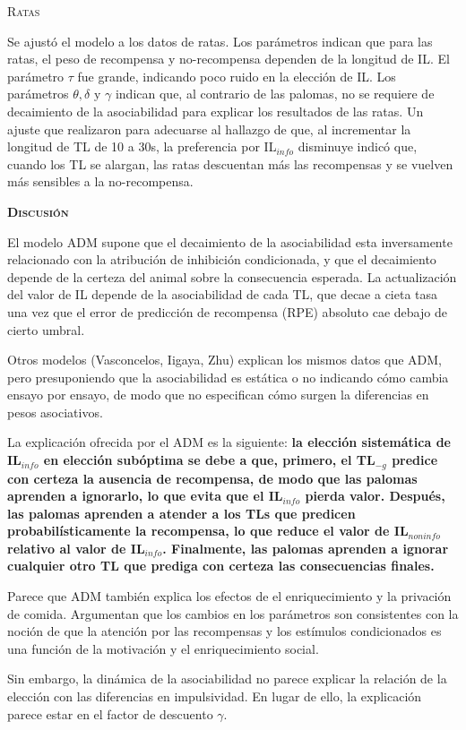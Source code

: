 \documentclass[a4paper,12pt]{article}
\begin{document}
{\scshape Ratas}

Se ajustó el modelo a los datos de ratas. Los parámetros indican que para las ratas, el peso de recompensa y no-recompensa dependen de la longitud de IL. El parámetro $\tau$ fue grande, indicando poco ruido en la elección de IL. Los parámetros $\theta,\delta \mbox{ y } \gamma$ indican que, al contrario de las palomas, no se requiere de decaimiento de la asociabilidad para explicar los resultados de las ratas. Un ajuste que realizaron para adecuarse al hallazgo de que, al incrementar la longitud de TL de 10 a 30s, la preferencia por IL$_{info}$ disminuye indicó que, cuando los TL se alargan, las ratas descuentan más las recompensas y se vuelven más sensibles a la no-recompensa.

{\scshape\bfseries Discusión}

El modelo ADM supone que el decaimiento de la asociabilidad esta inversamente relacionado con la atribución de inhibición condicionada, y que el decaimiento depende de la certeza del animal sobre la consecuencia esperada. La actualización del valor de IL depende de la asociabilidad de cada TL, que decae a cieta tasa una vez que el error de predicción de recompensa (RPE) absoluto cae debajo de cierto umbral.

Otros modelos (Vasconcelos, Iigaya, Zhu) explican los mismos datos que ADM, pero presuponiendo que la asociabilidad es estática o no indicando cómo cambia ensayo por ensayo, de modo que no especifican cómo surgen la diferencias en pesos asociativos.

La explicación ofrecida por el ADM es la siguiente: {\bfseries la elección sistemática de IL$_{info}$ en elección subóptima se debe a que, primero, el TL$_{-g}$ predice con certeza la ausencia de recompensa, de modo que las palomas aprenden a ignorarlo, lo que evita que el IL$_{info}$ pierda valor. Después, las palomas aprenden a atender a los TLs que predicen probabilísticamente la recompensa, lo que reduce el valor de IL$_{noninfo}$ relativo al valor de IL$_{info}$. Finalmente, las palomas aprenden a ignorar cualquier otro TL que prediga con certeza las consecuencias finales.}

Parece que ADM también explica los efectos de el enriquecimiento y la privación de comida. Argumentan que los cambios en los parámetros son consistentes con la noción de que la atención por las recompensas y los estímulos condicionados es una función de la motivación y el enriquecimiento social.

Sin embargo, la dinámica de la asociabilidad no parece explicar la relación de la elección con las diferencias en impulsividad. En lugar de ello, la explicación parece estar en el factor de descuento $\gamma$.
\end{document}
